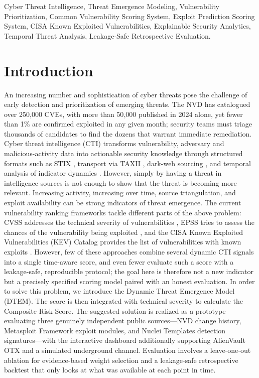\documentclass[conference]{IEEEtran}
\begin{document}
\begin{IEEEkeywords}
Cyber Threat Intelligence, Threat Emergence Modeling, Vulnerability Prioritization, Common Vulnerability Scoring System, Exploit Prediction Scoring System, CISA Known Exploited Vulnerabilities, Explainable Security Analytics, Temporal Threat Analysis, Leakage-Safe Retrospective Evaluation.
\end{IEEEkeywords}


\section{Introduction}

An increasing number and sophistication of cyber threats pose the challenge of early detection and prioritization of emerging threats. The NVD has catalogued over 250{,}000 CVEs, with more than 50{,}000 published in 2024 alone, yet fewer than 1\% are confirmed exploited in any given month; security teams must triage thousands of candidates to find the dozens that warrant immediate remediation. Cyber threat intelligence (CTI) transforms vulnerability, adversary and malicious-activity data into actionable security knowledge \cite{iot_security, chismon_ruks} through structured formats such as STIX \cite{stix}, transport via TAXII \cite{taxii}, dark-web sourcing \cite{darknet_mining, portnoff, threatcrawl, darkweb_evolution}, and temporal analysis of indicator dynamics \cite{dgef, temporal_cti}. However, simply by having a threat in intelligence sources is not enough to show that the threat is becoming more relevant. Increasing activity, increasing over time, source triangulation, and exploit availability can be strong indicators of threat emergence. The current vulnerability ranking frameworks tackle different parts of the above problem: CVSS addresses the technical severity of vulnerabilities \cite{cvss}, EPSS tries to assess the chances of the vulnerability being exploited \cite{epss}, and the CISA Known Exploited Vulnerabilities (KEV) Catalog provides the list of vulnerabilities with known exploits \cite{kev_catalog}. However, few of these approaches combine several dynamic CTI signals into a single time-aware score, and even fewer evaluate such a score with a leakage-safe, reproducible protocol; the goal here is therefore not a new indicator but a precisely specified scoring model paired with an honest evaluation. In order to solve this problem, we introduce the Dynamic Threat Emergence Model (DTEM). The score is then integrated with technical severity to calculate the Composite Risk Score. The suggested solution is realized as a prototype evaluating three genuinely independent public sources---NVD change history, Metasploit Framework exploit modules, and Nuclei Templates detection signatures---with the interactive dashboard additionally supporting AlienVault OTX and a simulated underground channel. Evaluation involves a leave-one-out ablation for evidence-based weight selection and a leakage-safe retrospective backtest that only looks at what was available at each point in time.
\end{document}
